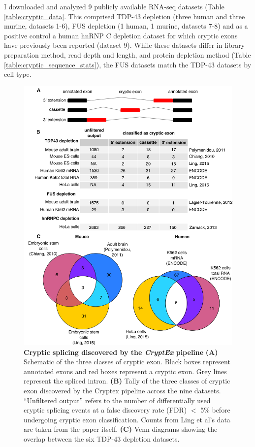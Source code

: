 I downloaded and analyzed 9 publicly available RNA-seq datasets (Table \ref{table:cryptic_data}. 
This comprised TDP-43 depletion (three human and three murine, datasets 1-6), FUS depletion (1 human, 1 murine, datasets 7-8) and as a positive control a human hnRNP C depletion dataset for which cryptic exons have previously been reported (dataset 9).  
While these datasets differ in library preparation method, read depth and length, and protein depletion method (Table \ref{table:cryptic_sequence_stats}), the FUS datasets match the TDP-43 datasets by cell type. 

\begin{figure}[h!]
	\centering
	\includegraphics[width=\textwidth]{Figures/03_cryptic_exons/Figure_1_venn_inkscape.png}
	\caption[Cryptic splicing discovered by the \emph{CryptEx} pipeline]{
		\textbf{Cryptic splicing discovered by the \emph{CryptEx} pipeline}
	\textbf{(A)} Schematic of the three classes of cryptic exon. Black boxes represent annotated exons and red boxes represent a cryptic exon. Grey lines represent the spliced intron. 
	\textbf{(B)} Tally of the three classes of cryptic exon discovered by the Cryptex pipeline across the nine datasets. ``Unfiltered output'' refers to the number of differentially used cryptic splicing events at a false discovery rate (FDR) $<$ 5\% before undergoing cryptic exon classification. Counts from Ling et al's data are taken from the paper itself. 
	\textbf{(C)} Venn diagrams showing the overlap between the six TDP-43 depletion datasets.
}
	\label{fig:cryptic_venn}
\end{figure}

